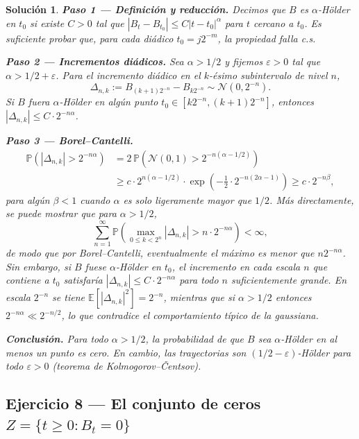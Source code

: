 \documentclass[12pt,letterpaper]{article}
\theoremstyle{ejercicio}
\theoremstyle{solucion}
\newtheorem*{solucion}{Solución}
\newcommand{\E}{\mathbb{E}}
\renewcommand{\P}{\mathbb{P}}
\begin{document}
\begin{solucion}

\textbf{Paso 1 — Definición y reducción.}
Decimos que $B$ es $\alpha$-Hölder en $t_0$ si existe $C>0$ tal que
$|B_t-B_{t_0}|\le C|t-t_0|^\alpha$ para $t$ cercano a $t_0$.
Es suficiente probar que, para cada diádico $t_0=j2^{-m}$, la propiedad falla c.s.

\textbf{Paso 2 — Incrementos diádicos.}
Sea $\alpha>1/2$ y fijemos $\varepsilon>0$ tal que $\alpha>1/2+\varepsilon$.
Para el incremento diádico en el $k$-ésimo subintervalo de nivel $n$,
\[
  \Delta_{n,k} := B_{(k+1)2^{-n}}-B_{k2^{-n}}\sim\mathcal{N}(0,2^{-n}).
\]
Si $B$ fuera $\alpha$-Hölder en algún punto $t_0\in[k2^{-n},(k+1)2^{-n}]$, entonces
$|\Delta_{n,k}|\le C\cdot 2^{-n\alpha}$.

\textbf{Paso 3 — Borel–Cantelli.}
\begin{align*}
  \P\!\left(|\Delta_{n,k}| > 2^{-n\alpha}\right)
  &= 2\,\P\!\left(\mathcal{N}(0,1)>2^{-n(\alpha-1/2)}\right)\\
  &\ge c\cdot 2^{n(\alpha-1/2)}\cdot \exp\!\left(-\tfrac{1}{2}\cdot 2^{-n(2\alpha-1)}\right)
  \ge c\cdot 2^{-n\beta},
\end{align*}
para algún $\beta<1$ cuando $\alpha$ es solo ligeramente mayor que $1/2$.
Más directamente, se puede mostrar que para $\alpha>1/2$,
\[
  \sum_{n=1}^\infty \P\!\left(\max_{0\le k<2^n}|\Delta_{n,k}| > n\cdot 2^{-n\alpha}\right)
  < \infty,
\]
de modo que por Borel--Cantelli, eventualmente el máximo es menor que $n2^{-n\alpha}$.
Sin embargo, si $B$ fuese $\alpha$-Hölder en $t_0$, el incremento en cada escala $n$ que
contiene a $t_0$ satisfaría $|\Delta_{n,k}|\le C\cdot 2^{-n\alpha}$ para todo $n$ suficientemente
grande. En escala $2^{-n}$ se tiene
$\E[|\Delta_{n,k}|^2]=2^{-n}$, mientras que si $\alpha>1/2$
entonces $2^{-n\alpha}\ll 2^{-n/2}$, lo que contradice el comportamiento típico de la gaussiana.

\textbf{Conclusión.}
Para todo $\alpha>1/2$, la probabilidad de que $B$ sea $\alpha$-Hölder en al menos un punto
es cero. En cambio, las trayectorias son $(1/2-\varepsilon)$-Hölder para todo $\varepsilon>0$
(teorema de Kolmogorov–Čentsov).
\end{solucion}

\subsection*{Ejercicio 8 — El conjunto de ceros $Z=\{t\ge 0: B_t=0\}$}
\end{document}
